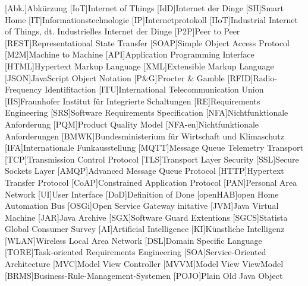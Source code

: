 \begin{acronym}[DHBW]
 [Abk.]{Abkürzung}
 [IoT]{Internet of Things}
 [IdD]{Internet der Dinge}
 [SH]{Smart Home}
 [IT]{Informationstechnologie}
 [IP]{Internetprotokoll}
 [IIoT]{Industrial Internet of Things, dt. Industrielles Internet der Dinge}
 [P2P]{Peer to Peer} 
 [REST]{Representational State Transfer}
 [SOAP]{Simple Object Access Protocol}
 [M2M]{Machine to Machine}
 [API]{Application Programming Interface}
 [HTML]{Hypertext Markup Language}
 [XML]{Extensible Markup Language}
 [JSON]{JavaScript Object Notation}
 [P\&G]{Procter \& Gamble}
 [RFID]{Radio-Frequency Identifitaction}
 [ITU]{International Telecommunication Union}
 [IIS]{Fraunhofer Institut für Integrierte Schaltungen}
 [RE]{Requirements Engineering}
 [SRS]{Software Requirements Specification}
 [NFA]{Nichtfunktionale Anforderung}
 [PQM]{Product Quality Model}
 [NFA-en]{Nichtfunktionale Anforderungen}
 [BMWK]{Bundesministerium für Wirtschaft und Klimaschutz}
 [IFA]{Internationale Funkausstellung}
 [MQTT]{Message Queue Telemetry Transport}
 [TCP]{Transmission Control Protocol}
 [TLS]{Transport Layer Security}
 [SSL]{Secure Sockets Layer}
 [AMQP]{Advanced Message Queue Protocol} 
 [HTTP]{Hypertext Transfer Protocol}
 [CoAP]{Constrained Application Protocol}
 [PAN]{Personal Area Network} 
 [UI]{User Interface}
 [DoD]{Definition of Done}
 [openHAB]{open Home Automation Bus}
 [OSGi]{Open Service Gateway initative}
 [JVM]{Java Virtual Machine}
 [JAR]{Java Archive}
 [SGX]{Software Guard Extentions}
 [SGCS]{Statista Global Consumer Survey}
 [AI]{Artificial Intelligence}
 [KI]{Künstliche Intelligenz}
 [WLAN]{Wireless Local Area Network} 
 [DSL]{Domain Specific Language}
 [TORE]{Task-oriented Requirements Engineering}
 [SOA]{Service-Oriented Architecture}
 [MVC]{Model View Controller}
 [MVVM]{Model View ViewModel}
 [BRMS]{Business-Rule-Management-Systemen}
 [POJO]{Plain Old Java Object}


\end{acronym}
